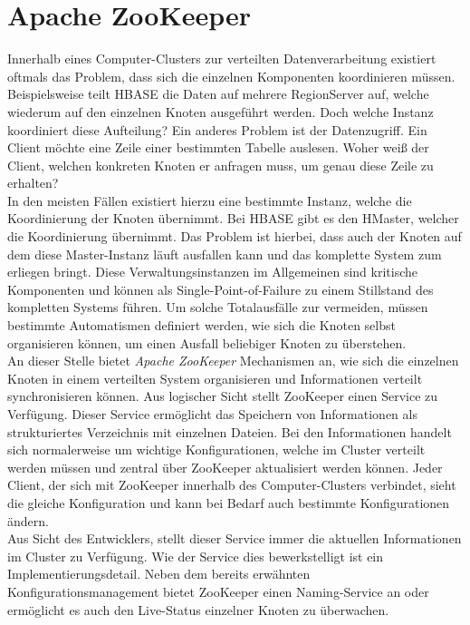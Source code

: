 \noindent


\section{Apache ZooKeeper}
\label{sec:theory_zookeeper}

Innerhalb eines Computer-Clusters zur verteilten Datenverarbeitung existiert oftmals das Problem, dass sich die einzelnen Komponenten koordinieren müssen. Beispielsweise teilt HBASE die Daten auf mehrere RegionServer auf, welche wiederum auf den einzelnen Knoten ausgeführt werden. Doch welche Instanz koordiniert diese Aufteilung? Ein anderes Problem ist der Datenzugriff. Ein Client möchte eine Zeile einer bestimmten Tabelle auslesen. Woher weiß der Client, welchen konkreten Knoten er anfragen muss, um genau diese Zeile zu erhalten?\\ 
In den meisten Fällen existiert hierzu eine bestimmte Instanz, welche die Koordinierung der Knoten übernimmt. Bei HBASE gibt es den HMaster, welcher die Koordinierung übernimmt. Das Problem ist hierbei, dass auch der Knoten auf dem diese Master-Instanz läuft ausfallen kann und das komplette System zum erliegen bringt. Diese Verwaltungsinstanzen im Allgemeinen sind kritische Komponenten und können als Single-Point-of-Failure zu einem Stillstand des kompletten Systems führen. Um solche Totalausfälle zur vermeiden, müssen bestimmte Automatismen definiert werden, wie sich die Knoten selbst organisieren können, um einen Ausfall beliebiger Knoten zu überstehen.\\

\noindent
An dieser Stelle bietet \textit{Apache ZooKeeper\texttrademark\thinspace} Mechanismen an, wie sich die einzelnen Knoten in einem verteilten System organisieren und Informationen verteilt synchronisieren können. Aus logischer Sicht stellt ZooKeeper einen Service zu Verfügung. 
Dieser Service ermöglicht das Speichern von Informationen als strukturiertes Verzeichnis mit einzelnen Dateien. Bei den Informationen handelt sich normalerweise um wichtige Konfigurationen, welche im Cluster verteilt werden müssen und zentral über ZooKeeper aktualisiert werden können. Jeder Client, der sich mit ZooKeeper innerhalb des Computer-Clusters verbindet, sieht die gleiche Konfiguration und kann bei Bedarf auch bestimmte Konfigurationen ändern.\cite[S. 4 ff]{professional_hadoop} \\
Aus Sicht des Entwicklers, stellt dieser Service immer die aktuellen Informationen im Cluster zu Verfügung. Wie der Service dies bewerkstelligt ist ein Implementierungsdetail. 
Neben dem bereits erwähnten Konfigurationsmanagement bietet ZooKeeper einen Naming-Service an oder ermöglicht es auch den Live-Status einzelner Knoten zu überwachen.\cite{zookeeper_essentials}\\

